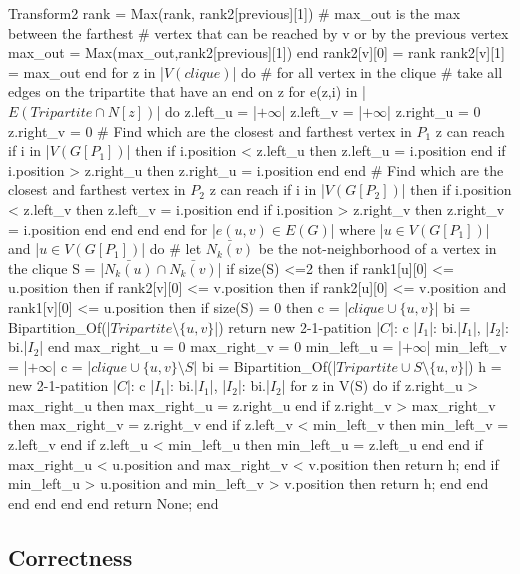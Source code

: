\begin{code}{Transform2}
      rank = Max(rank, rank2[previous][1]) 
      # max_out is the max between the farthest
      # vertex that can be reached by v or by the previous vertex
      max_out = Max(max_out,rank2[previous][1])  
    end
    rank2[v][0] = rank
    rank2[v][1] = max_out
  end
  for z in |$V(clique)$| do # for all vertex in the clique
    # take all edges on the tripartite that have an end on z
    for e(z,i) in |$E(Tripartite \cap N[z])$| do 
      z.left_u = |$+\infty$|
      z.left_v = |$+\infty$|
      z.right_u = 0
      z.right_v = 0
      # Find which are the closest and farthest vertex in $P_1$ z can reach
      if i in |$V(G[P_1])$| then 
        if i.position < z.left_u then
          z.left_u = i.position
        end
        if i.position > z.right_u then
          z.right_u = i.position
        end
      end
      # Find which are the closest and farthest vertex in $P_2$ z can reach
      if i in |$V(G[P_2])$| then 
        if i.position < z.left_v then
          z.left_v = i.position
        end
        if i.position > z.right_v then
          z.right_v = i.position
        end
      end  
    end
  end
  for |$e(u,v) \in E(G)$| where |$u \in V(G[P_1])$| and |$u \in V(G[P_1])$| do
    # let $\bar{N_k(v)}$ be the not-neighborhood of a vertex in the clique
    S = |$\bar{N_k(u)} \cap \bar{N_k(v)}$|
    if size(S) <=2 then
     if rank1[u][0] <= u.position then
       if rank2[v][0] <= v.position then
         if rank2[u][0] <= v.position and rank1[v][0] <= u.position then
           if size(S) = 0 then
             c = |$clique \cup \{u,v\}$|
             bi = Bipartition_Of(|$Tripartite \setminus \{u,v\}$|)
             return new 2-1-patition{
               |$C$|: c
               |$I_1$|: bi.|$I_1$|,
               |$I_2$|: bi.|$I_2$|
             }
           end
           max_right_u = 0
           max_right_v = 0
           min_left_u = |$+\infty$|
           min_left_v = |$+\infty$|
           c = |$clique \cup \{u,v\} \setminus S$|
           bi = Bipartition_Of(|$Tripartite \cup S \setminus \{u,v\}$|)
           h = new 2-1-patition{
               |$C$|: c
               |$I_1$|: bi.|$I_1$|,
               |$I_2$|: bi.|$I_2$|
             }
           for z in V(S) do
            if z.right_u > max_right_u then
              max_right_u = z.right_u
            end
            if z.right_v > max_right_v then
              max_right_v = z.right_v
            end
            if z.left_v < min_left_v then
              min_left_v = z.left_v
            end
            if z.left_u < min_left_u then
              min_left_u = z.left_u
            end
           end
           if max_right_u < u.position and max_right_v < v.position then
             return h;
           end
           if min_left_u > u.position and min_left_v > v.position then
             return h;
           end
         end
       end
     end
    end    
  end
  return None;
end
\end{code}

\subsection{Correctness}
